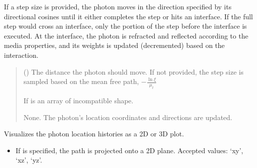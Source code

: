 \documentclass[letterpaper,10pt,english]{sphinxmanual}
\begin{document}
\begin{fulllineitems}
\begin{fulllineitems}
\sphinxAtStartPar
If a step size is provided, the photon moves in the direction specified by its directional cosines until it
either completes the step or hits an interface. If the full step would cross an interface, only the portion of
the step before the interface is executed. At the interface, the photon is refracted and reflected according to
the media properties, and its weights is updated (decremented) based on the interaction.
\begin{quote}\begin{description}
\sphinxAtStartPar
{} (\sphinxstyleliteralemphasis{\sphinxupquote{ | }}\sphinxstyleliteralemphasis{\sphinxupquote{{[}}}\sphinxstyleliteralemphasis{\sphinxupquote{{]}}}\sphinxstyleliteralemphasis{\sphinxupquote{, }}) \textendash{} The distance the photon should move. If not provided, the step size is sampled based on the mean
free path, \(-\frac{\ln\xi}{\mu_t}\)

\sphinxAtStartPar
{} \textendash{} If  is an array of incompatible shape.

\sphinxAtStartPar
{}

\sphinxAtStartPar
None. The photon’s location coordinates and directions are updated.

\end{description}\end{quote}

\end{fulllineitems}


\begin{fulllineitems}
\label{\detokenize{generated/photon_canon.optics:photon_canon.optics.Photon.plot_path}}
\pysigstartsignatures
\pysiglinewithargsret
{}
{\sphinxparamcomma {}\sphinxparamcomma {}}
{}
\pysigstopsignatures
\sphinxAtStartPar
Visualizes the photon location histories as a 2D or 3D plot.
\begin{itemize}
\item {} 
\sphinxAtStartPar
If  is specified, the path is projected onto a 2D plane.
Accepted values: ‘xy’, ‘xz’, ‘yz’.


\end{itemize}
\end{fulllineitems}
\end{fulllineitems}
\end{document}
